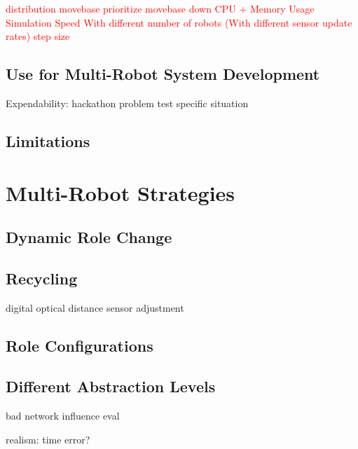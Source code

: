 \textcolor{red}{
distribution movebase
prioritize movebase down
CPU + Memory Usage
Simulation Speed
With different number of robots
(With different sensor update rates)
step size}
\subsection{Use for Multi-Robot System Development}
Expendability: hackathon
problem test specific situation
\subsection{Limitations}

\section{Multi-Robot Strategies}
\label{sec:multi_robot_strategies}
\subsection{Dynamic Role Change}
\subsection{Recycling}
digital optical distance sensor adjustment
\subsection{Role Configurations}
\subsection{Different Abstraction Levels}
bad network influence eval




realism: time error?


